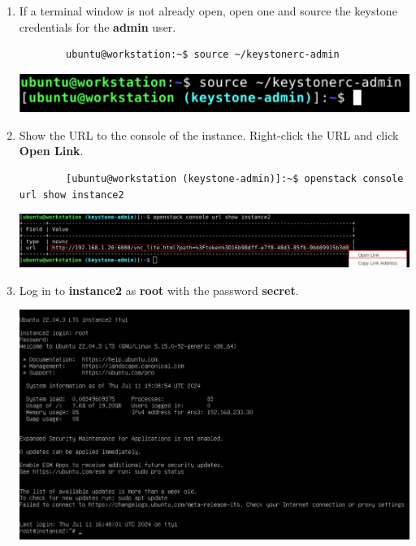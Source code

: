 \documentclass[letterpaper, 12pt]{article}
\begin{document}
\begin{enumerate}
    \item If a terminal window is not already open, open one and source the keystone credentials for the \textbf{admin}
    user.
    \begin{lstlisting}
        ubuntu@workstation:~$ source ~/keystonerc-admin
    \end{lstlisting}

    \begin{center}
        \includegraphics[width=\linewidth]{images/part4/step1.png}
    \end{center}

    \item Show the URL to the console of the instance.
    Right-click the URL and click \textbf{Open Link}.
    \begin{lstlisting}
        [ubuntu@workstation (keystone-admin)]:~$ openstack console url show instance2
    \end{lstlisting}

    \begin{center}
        \includegraphics[width=\linewidth]{images/part4/step2.png}
    \end{center}

    \item Log in to \textbf{instance2} as \textbf{root} with the password \textbf{secret}.

    \begin{center}
        \includegraphics[width=\linewidth]{images/part4/step3.png}
    \end{center}


\end{enumerate}
\end{document}
